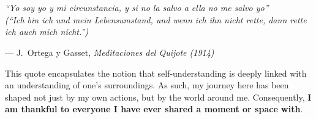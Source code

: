 
\chapter*{\hfill\color{darkred}\hfill{}\color{black}{Acknowledgements}\hfill\color{darkred}\hfill}
    
    \epigraph{\itshape ``Yo soy yo y mi circunstancia, y si no la salvo a ella no me salvo yo'' \\ \scriptsize(``Ich bin ich und mein Lebensumstand, und wenn ich ihn nicht rette, dann rette ich auch mich nicht.'')}{--- J.~Ortega y Gasset, \textit{Meditaciones del Quijote (1914)}}

    This quote encapsulates the notion that self-understanding is deeply linked with an understanding of one's surroundings. As such, my journey here has been shaped not just by my own actions, but by the world around me. Consequently, \textbf{I am thankful to everyone I have ever shared a moment or space with}.

